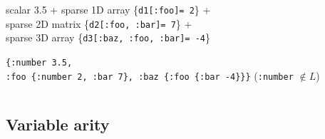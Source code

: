 \documentclass{beamer}
\newcommand{\msmagenta}[1]{{\color{mymagenta} #1}}
\begin{document}
\begin{frame}
\begin{columns}[T]
\begin{column}{0.5\textwidth}
\begin{itemize}
{\msmagenta{
 \item {\tiny  scalar 3.5 + sparse 1D array \{{\tt d1[:foo]= 2}\} +\\[1.5ex] sparse 2D
matrix \{{\tt d2[:foo, :bar]= 7}\} +\\  sparse 3D array \{{\tt d3[:baz, :foo, :bar]= -4}\}}
}

 \item {\tt \{:number 3.5,\\ :foo \{:number 2, :bar 7\}, :baz \{:foo \{:bar -4\}\}\}}
          ({\tt :number} $\not\in L$)

}

\end{itemize}

\end{column}
\end{columns}

\end{frame}






\subsection{Variable arity}
\end{document}
